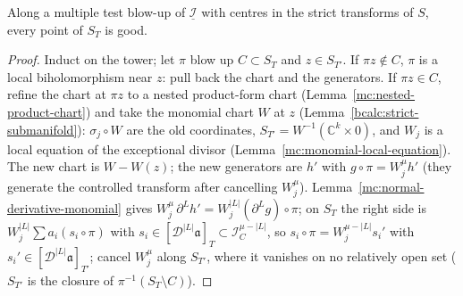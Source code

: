\begin{lemma}
\label{mc:normal-coefficient-step}
\leanok
Along a multiple test blow-up of \(\underline{\mathcal I}\) with centres in the strict transforms of \(S\), every point of \(S_T\) is good.
\end{lemma}
\begin{proof}
\leanok
Induct on the tower; let \(\pi\) blow up \(C\subset S_T\) and \(z\in S_{T'}\). If \(\pi z\notin C\), \(\pi\) is a local biholomorphism near \(z\): pull back the chart and the
generators. If \(\pi z\in C\), refine the chart at \(\pi z\) to a nested product-form chart (Lemma~\ref{mc:nested-product-chart}) and take the monomial chart \(W\) at
\(z\) (Lemma~\ref{bcalc:strict-submanifold}): \(\sigma_j\circ W\) are the old coordinates, \(S_{T'}=W^{-1}(\mathbb C^k\times0)\), and \(W_j\) is a local equation of the
exceptional divisor (Lemma~\ref{mc:monomial-local-equation}). The new chart is \(W-W(z)\); the new generators are \(h'\) with \(g\circ\pi=W_j^\mu h'\) (they generate the
controlled transform after cancelling \(W_j^\mu\)). Lemma~\ref{mc:normal-derivative-monomial} gives
\(W_j^\mu\,\partial^Lh'=W_j^{|L|}(\partial^Lg)\circ\pi\); on \(S_T\) the right side is \(W_j^{|L|}\sum a_i(s_i\circ\pi)\) with \(s_i\in[\mathcal D^{|L|}\mathfrak a]_T\subset\mathcal I_C^{\mu-|L|}\),
so \(s_i\circ\pi=W_j^{\mu-|L|}s_i'\) with \(s_i'\in[\mathcal D^{|L|}\mathfrak a]_{T'}\); cancel \(W_j^\mu\) along \(S_{T'}\), where it vanishes on no relatively open set
(\(S_{T'}\) is the closure of \(\pi^{-1}(S_T\setminus C)\)).
\end{proof}

